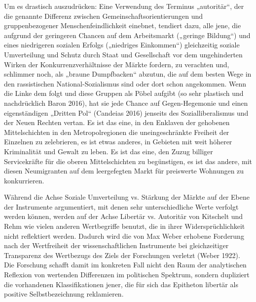\begin{multicols*}{2}
Um es drastisch auszudrücken: Eine Verwendung des Terminus „autoritär“, der die genannte Differenz zwischen Gemeinschaftsorientierungen und gruppenbezogener Menschenfeindlichkeit einebnet, tendiert dazu, alle jene, die aufgrund der geringeren Chancen auf dem Arbeitsmarkt („geringe Bildung“) und eines niedrigeren sozialen Erfolgs („niedriges Einkommen“) gleichzeitig soziale Umverteilung und Schutz durch Staat und Gesellschaft vor dem ungehinderten Wirken der Konkurrenzverhältnisse der Märkte fordern, zu verachten und, schlimmer noch, als „braune Dumpfbacken“ abzutun, die auf dem besten Wege in den rassistischen National-Sozialismus sind oder dort schon angekommen. Wenn die Linke dem folgt und diese Gruppen als Pöbel aufgibt (so sehr plastisch und nachdrücklich Baron 2016), hat sie jede Chance auf Gegen-Hegemonie und einen eigenständigen „Dritten Pol“ (Candeias 2016) jenseits des Sozialliberalismus und der Neuen Rechten vertan. Es ist das eine, in den Enklaven der gehobenen Mittelschichten in den Metropolregionen die uneingeschränkte Freiheit der Einzelnen zu zelebrieren, es ist etwas anderes, in Gebieten mit weit höherer Kriminalität und Gewalt zu leben. Es ist das eine, den Zuzug billiger Servicekräfte für die oberen Mittelschichten zu begünstigen, es ist das andere, mit diesen Neumigranten auf dem leergefegten Markt für preiswerte Wohnungen zu konkurrieren.

Während die Achse Soziale Umverteilung vs. Stärkung der Märkte auf der Ebene der Instrumente argumentiert, mit denen sehr unterschiedliche Werte verfolgt werden können,  werden auf der Achse Libertär vs. Autoritär von Kitschelt und Rehm wie vielen anderen Wertbegriffe benutzt, die in ihrer Widersprüchlichkeit nicht reflektiert werden. Dadurch wird die von Max Weber erhobene Forderung nach der Wertfreiheit der wissenschaftlichen Instrumente bei gleichzeitiger Transparenz des Wertbezugs des Ziels der Forschungen verletzt (Weber 1922). Die Forschung schafft damit im konkreten Fall nicht den Raum der analytischen Reflexion von wertenden Differenzen im politischen Spektrum, sondern dupliziert die vorhandenen Klassifikationen jener, die für sich das Epitheton libertär als positive Selbstbezeichnung reklamieren.


\end{multicols*}
